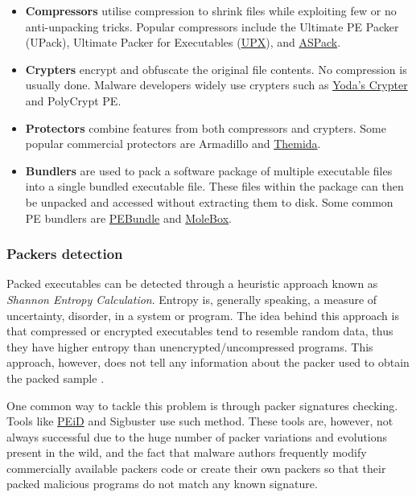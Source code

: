 \documentclass[pdfa%
,cucitura%
]{toptesi}
\begin{document}
\begin{itemize}
	\item \textbf{Compressors} utilise compression to shrink files while exploiting few or no anti-unpacking tricks. Popular compressors include the Ultimate PE Packer (UPack), Ultimate Packer for Executables (\href{https://upx.github.io/}{UPX}), and \href{http://www.aspack.com/}{ASPack}.
	
	\item \textbf{Crypters} encrypt and obfuscate the original file contents. No compression is usually done. Malware developers widely use crypters such as \href{https://sourceforge.net/projects/yodap/}{Yoda's Crypter} and PolyCrypt PE.
	
	\item \textbf{Protectors} combine features from both compressors and crypters. Some popular commercial protectors are Armadillo and \href{https://www.oreans.com/Themida.php}{Themida}.
	
	\item \textbf{Bundlers} are used to pack a software package of multiple executable files into a single bundled executable file. These files within the package can then be unpacked and accessed without extracting them to disk. Some common PE bundlers are \href{https://www.bitsum.com/pebundle.asp}{PEBundle} and \href{https://www.molebox.com}{MoleBox}.
\end{itemize}

\subsubsection{Packers detection}
Packed executables can be detected through a heuristic approach known as \textit{Shannon Entropy Calculation}. Entropy is, generally speaking, a measure of uncertainty, disorder, in a system or program. The idea behind this approach is that compressed or encrypted executables tend to resemble random data, thus they have higher entropy than unencrypted/uncompressed programs. This approach, however, does not tell any information about the packer used to obtain the packed sample \cite{SikorskiPMA}.

One common way to tackle this problem is through packer signatures checking. Tools like \href{https://www.aldeid.com/wiki/PEiD}{PEiD} and Sigbuster use such method. These tools are, however, not always successful due to the huge number of packer variations and evolutions present in the wild, and the fact that malware authors frequently modify commercially available packers code or create their own packers so that their packed malicious programs do not match any known signature.
\end{document}
